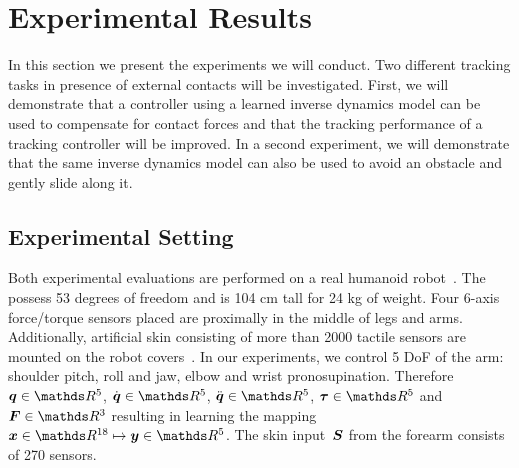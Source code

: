 
\section{Experimental Results}
\label{sec:robIROS_results}

In this section we present the experiments we will conduct. Two different tracking tasks in presence of external contacts will be investigated.
First, we will demonstrate that a controller using a learned inverse dynamics model can be used to compensate for contact forces and that the tracking performance of a tracking controller will be improved.
In a second experiment, we will demonstrate that the same inverse dynamics model can also be used to avoid an obstacle and gently slide along it. 



\subsection{Experimental Setting}

	Both experimental evaluations are performed on a real \robot{} humanoid robot~\cite{Natale2013}.
    The \robot{} possess 53 degrees of freedom and is 104 cm tall for 24 kg of weight.
    Four 6-axis force/torque sensors placed are proximally in the middle of legs and arms.
    Additionally, artificial skin consisting of more than 2000 tactile sensors are mounted on the robot covers~\cite{Cannata2008}.
    In our experiments, we control 5 DoF of the \robot{} arm: shoulder pitch, roll and jaw, elbow and wrist pronosupination. 
    Therefore $\q \in \R^5$, $\dq \in \R^5$, $\ddq \in \R^5$, $\torques \in \R^5$ and $\ftsForces \in \R^3$ resulting in learning the mapping $\inputMatrix \in \R^{18} \mapsto \outputMatrix \in \R^5$.
    The skin input~$\mathcal{\boldsymbol{S}}$ from the forearm consists of 270 sensors.
    

